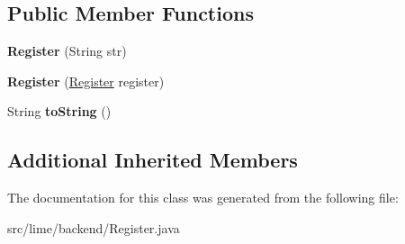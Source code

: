 \subsection*{Public Member Functions}
\begin{DoxyCompactItemize}
\item 
\mbox{\label{classlime_1_1backend_1_1Register_a9664f3d28d224d923764d249d069d297}} 
{\bfseries Register} (String str)
\item 
\mbox{\label{classlime_1_1backend_1_1Register_a7c04fe0eddd1dc4fee79868333a9771d}} 
{\bfseries Register} (\hyperlink{classlime_1_1backend_1_1Register}{Register} register)
\item 
\mbox{\label{classlime_1_1backend_1_1Register_a7230122f9f91c7f26ccc306d9ce46f8f}} 
String {\bfseries to\+String} ()
\end{DoxyCompactItemize}
\subsection*{Additional Inherited Members}


The documentation for this class was generated from the following file\+:\begin{DoxyCompactItemize}
\item 
src/lime/backend/Register.\+java\end{DoxyCompactItemize}
